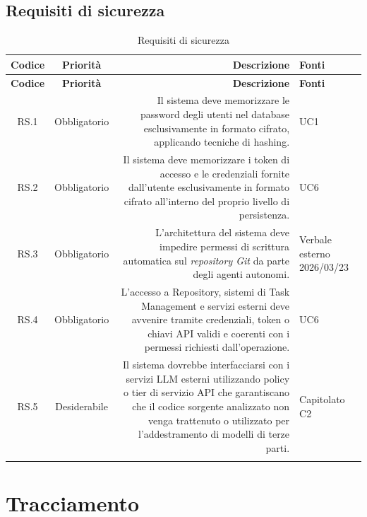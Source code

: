 \documentclass[12pt, a4paper]{article}
\begin{document}
\subsection{Requisiti di sicurezza}

\begingroup
\renewcommand{\arraystretch}{1.3}

\begin{xltabular}{\textwidth}{|c|c|D|F|}

    \hline
    \textbf{Codice} & \textbf{Priorità} & \textbf{Descrizione} & \textbf{Fonti} \\ 
    \hline
    \endfirsthead

    \hline
    \textbf{Codice} & \textbf{Priorità} & \textbf{Descrizione} & \textbf{Fonti} \\ 
    \hline
    \endhead

    RS.1 & Obbligatorio & Il sistema deve memorizzare le password degli utenti nel database esclusivamente in formato cifrato, applicando tecniche di hashing. & UC1 \\
    \hline
    RS.2 & Obbligatorio & Il sistema deve memorizzare i token di accesso e le credenziali fornite dall'utente esclusivamente in formato cifrato all'interno del proprio livello di persistenza. & UC6 \\
    \hline
    RS.3 & Obbligatorio & L'architettura del sistema deve impedire permessi di scrittura automatica sul \textit{repository Git} da parte degli agenti autonomi. & Verbale esterno 2026/03/23 \\
    \hline
    RS.4 & Obbligatorio & L’accesso a Repository, sistemi di Task Management e servizi esterni deve avvenire tramite credenziali, token o chiavi API validi e coerenti con i permessi richiesti dall’operazione. & UC6 \\
    \hline
    RS.5 & Desiderabile & Il sistema dovrebbe interfacciarsi con i servizi LLM esterni utilizzando policy o tier di servizio API che garantiscano che il codice sorgente analizzato non venga trattenuto o utilizzato per l'addestramento di modelli di terze parti. & Capitolato C2 \\
    \hline

    \caption{Requisiti di sicurezza}
    \label{tab:rs}
    
\end{xltabular}
\endgroup

\newpage

\section{Tracciamento}
\end{document}
